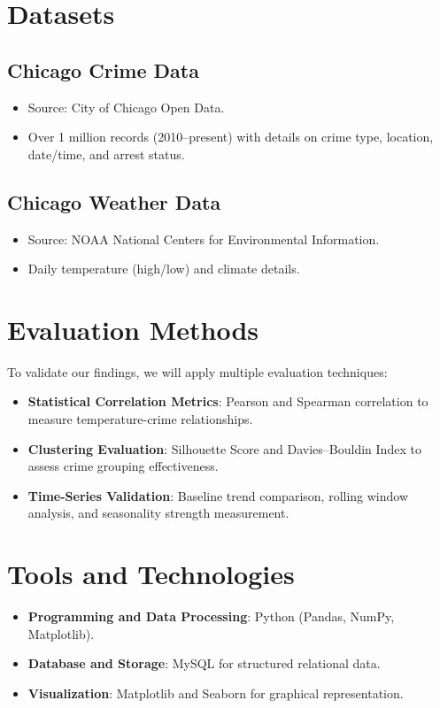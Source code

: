 \documentclass[sigconf]{acmart}
\begin{document}
\section{Datasets}
\subsection{Chicago Crime Data}
\begin{itemize}
    \item Source: City of Chicago Open Data.
    \item Over 1 million records (2010–present) with details on crime type, location, date/time, and arrest status.
\end{itemize}
\subsection{Chicago Weather Data}
\begin{itemize}
    \item Source: NOAA National Centers for Environmental Information.
    \item Daily temperature (high/low) and climate details.
\end{itemize}

\section{Evaluation Methods}
To validate our findings, we will apply multiple evaluation techniques:
\begin{itemize}
    \item \textbf{Statistical Correlation Metrics}: Pearson and Spearman correlation to measure temperature-crime relationships.
    \item \textbf{Clustering Evaluation}: Silhouette Score and Davies–Bouldin Index to assess crime grouping effectiveness.
    \item \textbf{Time-Series Validation}: Baseline trend comparison, rolling window analysis, and seasonality strength measurement.
\end{itemize}

\section{Tools and Technologies}
\begin{itemize}
    \item \textbf{Programming and Data Processing}: Python (Pandas, NumPy, Matplotlib).
    \item \textbf{Database and Storage}: MySQL for structured relational data.
    \item \textbf{Visualization}: Matplotlib and Seaborn for graphical representation.
\end{itemize}
\end{document}
